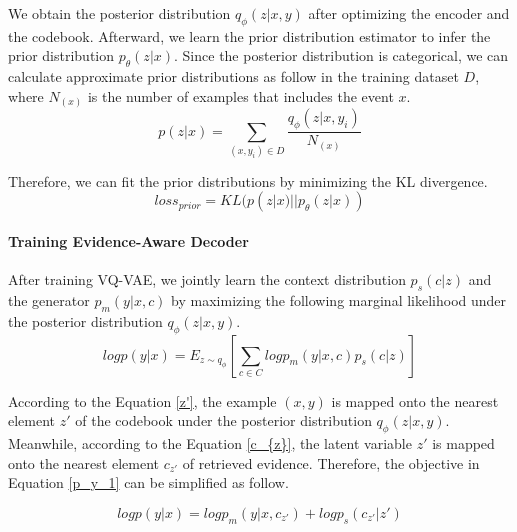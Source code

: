 \documentclass[11pt,a4paper]{article}
\begin{document}
We obtain the posterior distribution $q_\phi(z|x,y)$ after optimizing the encoder and the codebook. Afterward, we learn the prior distribution estimator to infer the prior distribution $p_\theta(z|x)$. 
Since the posterior distribution is categorical, we can calculate approximate prior distributions as follow in the training dataset $D$, where $N_{(x)}$ is the number of examples that includes the event $x$. 
\begin{equation}
p(z|x)=\sum_{(x,y_i)\in D}\frac{q_\phi(z|x,y_i)}{N_{(x)}}
\end{equation}

Therefore, we can fit the prior distributions by minimizing the KL divergence.
\begin{equation}
loss_{prior}=KL(p(z|x)||p_\theta(z|x))
\end{equation}




\paragraph{Training Evidence-Aware Decoder}
After training VQ-VAE, we jointly learn the context distribution $p_s(c|z)$ and the generator $p_m(y|x,c)$ by maximizing the following marginal likelihood under the posterior distribution $q_\phi(z|x,y)$.
\begin{equation}\label{p_y_1}
logp(y|x)=E_{z\sim q_\phi}[\sum_{c\in C}logp_m(y|x,c)p_s(c|z)]
\end{equation}

According to the Equation \ref{z'}, the example $(x,y)$ is mapped onto the nearest element $z'$ of the codebook under the posterior distribution $q_\phi(z|x,y)$. Meanwhile, according to the Equation \ref{c_{z}}, the latent variable $z'$ is mapped onto the nearest element $c_{z'}$ of retrieved evidence. 
Therefore, the objective in Equation \ref{p_y_1} can be simplified as follow.

\begin{equation}
logp(y|x)=logp_m(y|x,c_{z'})+logp_s(c_{z'}|z')
\end{equation}
\end{document}

